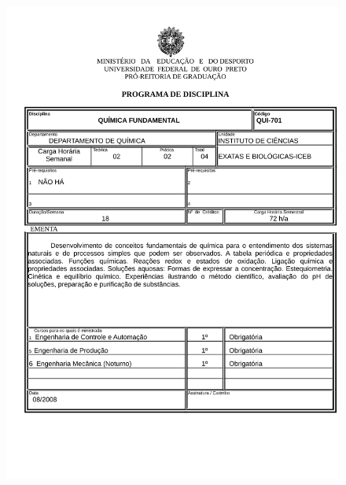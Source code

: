 \begin{figure}[p]
	\centering 
	\includegraphics[scale=0.7]{capitulos/anexo1-programas-disciplina/p26.pdf}
\end{figure}

